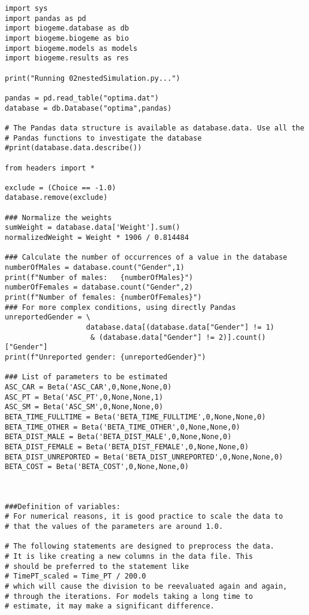 \documentclass[12pt,a4paper]{article}
\begin{document}
\begin{lstlisting}[style=numbers]
import sys
import pandas as pd
import biogeme.database as db
import biogeme.biogeme as bio
import biogeme.models as models
import biogeme.results as res

print("Running 02nestedSimulation.py...")

pandas = pd.read_table("optima.dat")
database = db.Database("optima",pandas)

# The Pandas data structure is available as database.data. Use all the
# Pandas functions to investigate the database
#print(database.data.describe())

from headers import *

exclude = (Choice == -1.0)
database.remove(exclude)

### Normalize the weights
sumWeight = database.data['Weight'].sum()
normalizedWeight = Weight * 1906 / 0.814484

### Calculate the number of occurrences of a value in the database
numberOfMales = database.count("Gender",1)
print(f"Number of males:   {numberOfMales}")
numberOfFemales = database.count("Gender",2)
print(f"Number of females: {numberOfFemales}")
### For more complex conditions, using directly Pandas
unreportedGender = \
                   database.data[(database.data["Gender"] != 1)
                    & (database.data["Gender"] != 2)].count()["Gender"]
print(f"Unreported gender: {unreportedGender}")

### List of parameters to be estimated
ASC_CAR = Beta('ASC_CAR',0,None,None,0)
ASC_PT = Beta('ASC_PT',0,None,None,1)
ASC_SM = Beta('ASC_SM',0,None,None,0)
BETA_TIME_FULLTIME = Beta('BETA_TIME_FULLTIME',0,None,None,0)
BETA_TIME_OTHER = Beta('BETA_TIME_OTHER',0,None,None,0)
BETA_DIST_MALE = Beta('BETA_DIST_MALE',0,None,None,0)
BETA_DIST_FEMALE = Beta('BETA_DIST_FEMALE',0,None,None,0)
BETA_DIST_UNREPORTED = Beta('BETA_DIST_UNREPORTED',0,None,None,0)
BETA_COST = Beta('BETA_COST',0,None,None,0)



###Definition of variables:
# For numerical reasons, it is good practice to scale the data to
# that the values of the parameters are around 1.0.

# The following statements are designed to preprocess the data.
# It is like creating a new columns in the data file. This
# should be preferred to the statement like
# TimePT_scaled = Time_PT / 200.0
# which will cause the division to be reevaluated again and again,
# through the iterations. For models taking a long time to
# estimate, it may make a significant difference.


\end{lstlisting}
\end{document}
